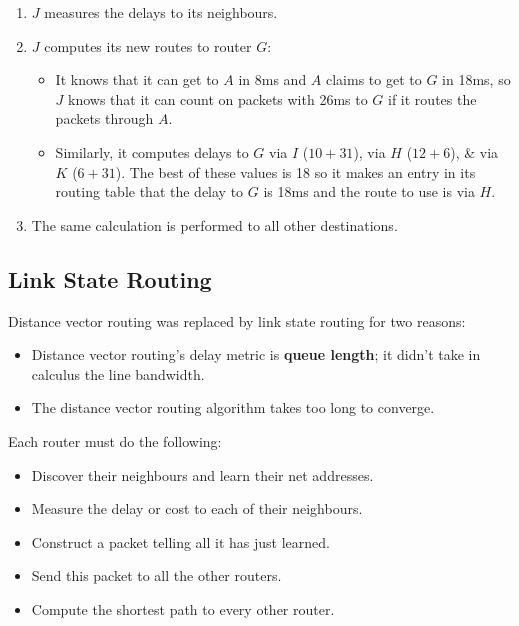 \documentclass[a4paper,11pt]{article}
\begin{document}
\begin{enumerate}
    \item   $J$ measures the delays to its neighbours.
    \item   $J$ computes its new routes to router $G$:
            \begin{itemize}
                \item   It knows that it can get to $A$ in 8ms and $A$ claims to get to $G$ in 18ms, so $J$ knows
                        that it can count on packets with 26ms to $G$ if it routes the packets through $A$.
                \item   Similarly, it computes delays to $G$ via $I$ ($10 + 31$), via $H$ ($12+6$), \& via $K$ 
                        ($6+31$). 
                        The best of these values is 18 so it makes an entry in its routing table that the delay 
                        to $G$ is 18ms and the route to use is via $H$.
            \end{itemize}
    \item   The same calculation is performed to all other destinations.
\end{enumerate}

\subsection{Link State Routing}
Distance vector routing was replaced by link state routing for two reasons:
\begin{itemize}
    \item   Distance vector routing's delay metric is \textbf{queue length}; it didn't take in calculus the line 
            bandwidth.
    \item   The distance vector routing algorithm takes too long to converge.
\end{itemize}

Each router must do the following:
\begin{itemize}
    \item   Discover their neighbours and learn their net addresses.
    \item   Measure the delay or cost to each of their neighbours.
    \item   Construct a packet telling all it has just learned.
    \item   Send this packet to all the other routers.
    \item   Compute the shortest path to every other router.
\end{itemize}
\end{document}
